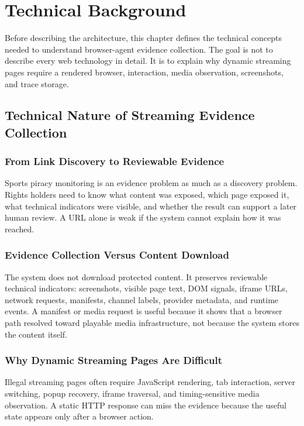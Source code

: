 \chapter{Technical Background}

Before describing the architecture, this chapter defines the technical concepts
needed to understand browser-agent evidence collection. The goal is not to
describe every web technology in detail. It is to explain why dynamic streaming
pages require a rendered browser, interaction, media observation, screenshots,
and trace storage.

\section{Technical Nature of Streaming Evidence Collection}

\subsection{From Link Discovery to Reviewable Evidence}

Sports piracy monitoring is an evidence problem as much as a discovery problem.
Rights holders need to know what content was exposed, which page exposed it,
what technical indicators were visible, and whether the result can support a
later human review. A URL alone is weak if the system cannot explain how it was
reached.

\subsection{Evidence Collection Versus Content Download}

The system does not download protected content. It preserves reviewable
technical indicators: screenshots, visible page text, DOM signals, iframe URLs,
network requests, manifests, channel labels, provider metadata, and runtime
events. A manifest or media request is useful because it shows that a browser
path resolved toward playable media infrastructure, not because the system
stores the content itself.

\subsection{Why Dynamic Streaming Pages Are Difficult}

Illegal streaming pages often require JavaScript rendering, tab interaction,
server switching, popup recovery, iframe traversal, and timing-sensitive media
observation. A static HTTP response can miss the evidence because the useful
state appears only after a browser action.

